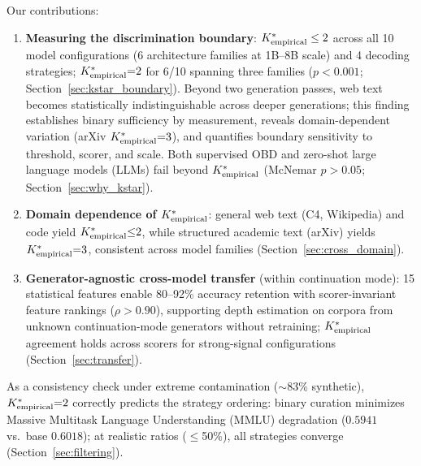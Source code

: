Our contributions:
\begin{enumerate}[label=(\alph*),nosep]
  \item \textbf{Measuring the discrimination boundary}: ${K^*_{\text{empirical}}} \leq 2$ across all 10 model configurations (6 architecture families at 1B--8B scale) and 4 decoding strategies; ${K^*_{\text{empirical}}}{=}2$ for 6/10 spanning three families ($p < 0.001$; Section~\ref{sec:kstar_boundary}).
  Beyond two generation passes, web text becomes statistically indistinguishable across deeper generations; this finding establishes binary sufficiency by measurement, reveals domain-dependent variation (arXiv ${K^*_{\text{empirical}}}{=}3$), and quantifies boundary sensitivity to threshold, scorer, and scale.
  Both supervised OBD and zero-shot large language models (LLMs) fail beyond ${K^*_{\text{empirical}}}$ (McNemar $p > 0.05$; Section~\ref{sec:why_kstar}).
  \item \textbf{Domain dependence of ${K^*_{\text{empirical}}}$}: general web text (C4, Wikipedia) and code yield ${K^*_{\text{empirical}}}{\leq}2$, while structured academic text (arXiv) yields ${K^*_{\text{empirical}}}{=}3$, consistent across model families (Section~\ref{sec:cross_domain}).
  \item \textbf{Generator-agnostic cross-model transfer} (within continuation mode): 15 statistical features enable 80--92\% accuracy retention with scorer-invariant feature rankings ($\rho > 0.90$), supporting depth estimation on corpora from unknown continuation-mode generators without retraining; ${K^*_{\text{empirical}}}$ agreement holds across scorers for strong-signal configurations (Section~\ref{sec:transfer}).
\end{enumerate}

\noindent As a consistency check under extreme contamination (${\sim}$83\% synthetic), ${K^*_{\text{empirical}}}{=}2$ correctly predicts the strategy ordering: binary curation minimizes Massive Multitask Language Understanding (MMLU) degradation ($0.5941$ vs.\ base $0.6018$); at realistic ratios ($\leq$50\%), all strategies converge (Section~\ref{sec:filtering}).

